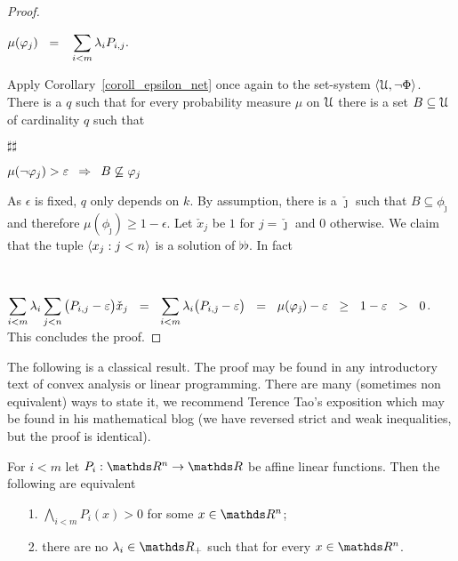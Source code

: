 \documentclass[sputnik.tex]{subfiles}
\begin{document}
\begin{proof}
\parbox{10ex}{~}
$\displaystyle\mu(\phi_j)\medrel{=}\sum_{i<m}\lambda_i P_{i,j}.$

Apply Corollary~\ref{coroll_epsilon_net} once again to the set-system $\langle\EuScript U,\neg\Phi\rangle$.
There is a $q$ such that for every probability measure $\mu$ on $\EuScript U$ there is a set $B\subseteq\EuScript U$ of cardinality $q$ such that

\parbox{10ex}{$\sharp\sharp$}
$\displaystyle\mu(\neg\phi_j)>\epsilon\medrel{\IMP}B\not\subseteq\phi_j$

As $\epsilon$ is fixed, $q$ only depends on $k$.
By assumption, there is a $\check\jmath$ such that $B\subseteq\phi_{\check\jmath}$ and therefore $\mu(\phi_{\check\jmath})\ge1-\epsilon$.
Let $\check x_j$ be $1$ for $j=\check\jmath$ and $0$ otherwise.
We claim that the tuple $\langle x_j:j<n\rangle$ is a solution of $\flat\flat$.
In fact

\parbox{10ex}{~}
$\displaystyle\sum_{i<m}\lambda_i\sum_{j<n}\big(P_{i,j}-\epsilon\big)\check x_j\medrel{=}{\sum_{i<m}\lambda_i\big(P_{i,\check\jmath}-\epsilon\big)}\medrel{=}\mu(\phi_{\check\jmath})-\epsilon\medrel{\ge}1-\epsilon\medrel{>}0$.
This concludes the proof.
\end{proof}

The following is a classical result.
The proof may be found in any introductory text of convex analysis or linear programming.
There are many (sometimes non equivalent) ways to state it, we recommend  Terence Tao's exposition which may be found in his mathematical blog (we have reversed strict and weak inequalities, but the proof is identical).

\begin{proposition}
For $i<m$ let $P_i:\RR^n\to\RR$ be affine linear functions.
Then the following are equivalent\nobreak  
\begin{itemize}
\item[1.] $\displaystyle\bigwedge_{i<m}P_i(x)> 0$ for some $x\in\RR^n$;
\item[2.] there are no $\lambda_i\in\RR_+$ such that  for every $x\in\RR^n$.\QED
\end{itemize}
\end{proposition}
\end{document}
